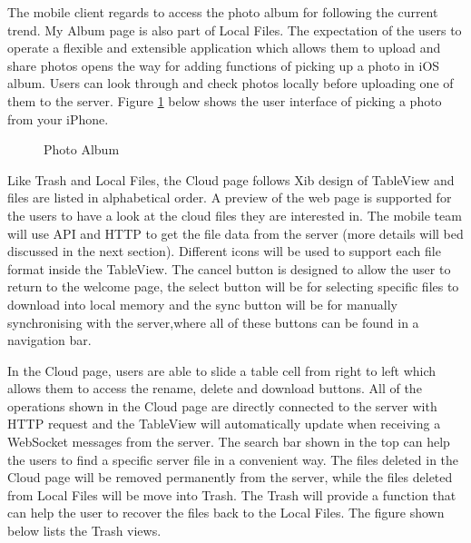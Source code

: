 \documentclass{article}
\begin{document}
The mobile client regards to access the photo album for following the current trend. My Album page is also part of Local Files. The expectation of the users to operate a flexible and extensible application which allows them to upload and share photos opens the way for adding functions of picking up a photo in iOS album. Users can look through and check photos locally before uploading one of them to the server. Figure \ref{fig:example17} below shows the user interface of picking a photo from your iPhone.

\begin{figure}[H]
    \centering
    \qquad
    \caption{Photo Album}%
    \label{fig:example17}%
\end{figure}

Like Trash and Local Files, the Cloud page follows Xib design of TableView and files are listed in alphabetical order. A preview of the web page is supported for the users to have a look at the cloud files they are interested in. The mobile team will use API and HTTP to get the file data from the server (more details will bed discussed in the next section). Different icons will be used to support each file format inside the TableView. The cancel button is designed to allow the user to return to the welcome page, the select button will be for selecting specific files to download into local memory and the sync button will be for manually synchronising with the server,where all of these buttons can be found in a navigation bar. 

In the Cloud page, users are able to slide a table cell from right to left which allows them to access the rename, delete and download buttons. All of the operations shown in the Cloud page are directly connected to the server with HTTP request and the TableView will automatically update when receiving a WebSocket messages from the server. The search bar shown in the top can help the users to find a specific server file in a convenient way. The files deleted in the Cloud page will be removed permanently from the server, while the files deleted from Local Files will be move into Trash. The Trash will provide a function that can help the user to recover the files back to the Local Files. The figure shown below lists the Trash views.
\end{document}
